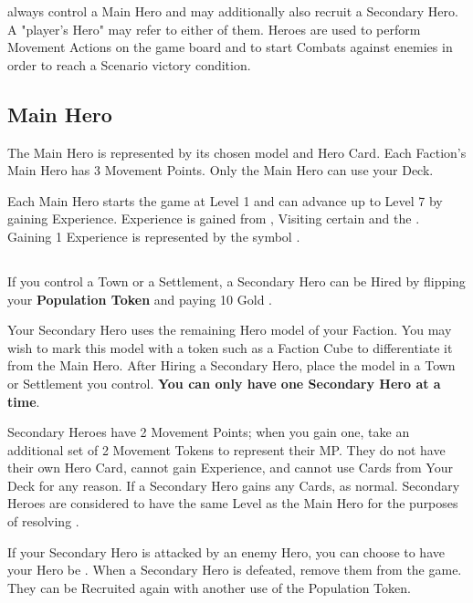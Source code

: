 
\begin{multicols*}{2}

 always control a Main Hero and may additionally also recruit a Secondary Hero.
A "player's Hero" may refer to either of them.
Heroes are used to perform Movement Actions on the game board and to start Combats against enemies in order to reach a Scenario victory condition.

\subsection*{Main Hero}
The Main Hero is represented by its chosen model and Hero Card.
Each Faction's Main Hero has 3 Movement Points.
Only the Main Hero can use your Deck.\par
Each Main Hero starts the game at Level 1 and can advance up to Level 7 by gaining Experience.
Experience is gained from , Visiting certain  and the  .
Gaining 1 Experience is represented by the symbol .

\subsection*{}
If you control a Town or a Settlement, a Secondary Hero can be Hired by flipping your \textbf{Population Token} and paying 10 Gold .\par
{}\par
Your Secondary Hero uses the remaining Hero model of your Faction.
You may wish to mark this model with a token such as a Faction Cube to differentiate it from the Main Hero.
After Hiring a Secondary Hero, place the model in a Town or Settlement you control.
\textbf{You can only have one Secondary Hero at a time}.\par
Secondary Heroes have 2 Movement Points; when you gain one, take an additional set of 2 Movement Tokens to represent their MP.
They do not have their own Hero Card, cannot gain Experience, and cannot use Cards from Your Deck for any reason.
If a Secondary Hero gains any Cards,  as normal.
Secondary Heroes are considered to have the same Level as the Main Hero for the purposes of resolving .\par
If your Secondary Hero is attacked by an enemy Hero, you can choose to have your Hero be .
When a Secondary Hero is defeated, remove them from the game.
They can be Recruited again with another use of the Population Token.\par


\end{multicols*}

